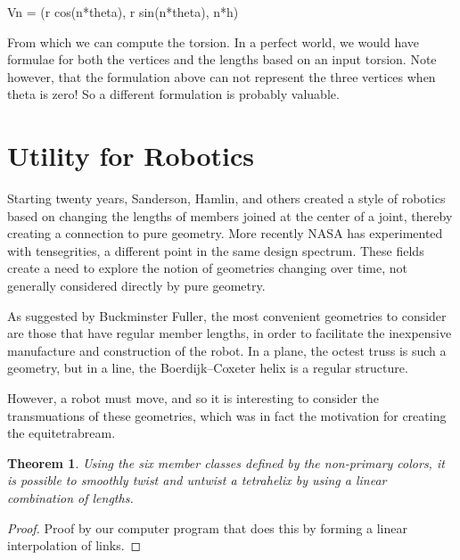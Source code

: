 \documentclass[11pt]{article}
\newtheorem{theorem}{Theorem}
\begin{document}
Vn = (r cos(n*theta), r sin(n*theta), n*h)

From which we can compute the torsion.  In a perfect world, we would have formulae for
both the vertices and the lengths based on an input torsion. Note however, that the
formulation above can not represent the three vertices when theta is zero!  So  a
different formulation is probably valuable.


\section{Utility for Robotics}

Starting twenty years, Sanderson, Hamlin, and others created a style of robotics based on changing the lengths of members
joined at the center of a joint, thereby creating a connection to pure geometry. More recently NASA has experimented with
tensegrities, a different point in the same design spectrum. These fields create a need to explore the notion of
geometries changing over time, not generally considered directly by pure geometry.

As suggested by Buckminster Fuller, the most convenient geometries to consider are those that have regular member
lengths, in order to facilitate the inexpensive manufacture and construction of the robot.  In a plane, the octest truss
is such a geometry, but in a line, the Boerdijk--Coxeter helix is a regular structure.

However, a robot must move, and so it is interesting to consider the transmuations of these geometries, which was in
fact the motivation for creating the equitetrabream.

\begin{theorem}

  Using the six member classes defined by the non-primary colors, it is possible to smoothly twist and untwist a tetrahelix by
  using a linear combination of lengths.
  
\end{theorem}

\begin{proof}
  Proof by our computer program that does this by forming a linear interpolation of links.
\end{proof}
\end{document}
